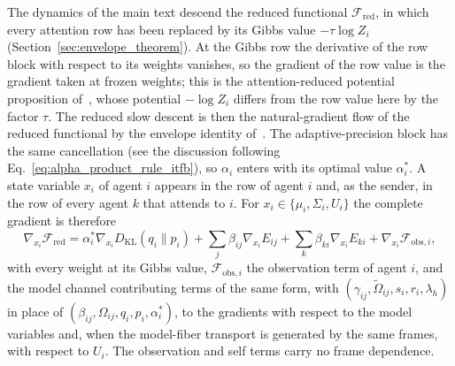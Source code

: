 The dynamics of the main text descend the reduced functional $\mathcal{F}_{\mathrm{red}}$, in which every attention row has been replaced by its Gibbs value $-\tau\log Z_i$ (Section~\ref{sec:envelope_theorem}). At the Gibbs row the derivative of the row block with respect to its weights vanishes, so the gradient of the row value is the gradient taken at frozen weights; this is the attention-reduced potential proposition of~\cite[Ch.~6]{DennisGaugeVFE2026}, whose potential $-\log Z_i$ differs from the row value here by the factor $\tau$. The reduced slow descent is then the natural-gradient flow of the reduced functional by the envelope identity of~\cite[Ch.~8]{DennisGaugeVFE2026}. The adaptive-precision block has the same cancellation (see the discussion following Eq.~\eqref{eq:alpha_product_rule_itfb}), so $\alpha_i$ enters with its optimal value $\alpha_i^*$. A state variable $x_i$ of agent $i$ appears in the row of agent $i$ and, as the sender, in the row of every agent $k$ that attends to $i$. For $x_i \in \{\mu_i, \Sigma_i, U_i\}$ the complete gradient is therefore
\begin{equation}
\nabla_{x_i}\mathcal{F}_{\mathrm{red}} = \alpha_i^*\nabla_{x_i}D_{\mathrm{KL}}(q_i \| p_i) + \sum_j \beta_{ij}\nabla_{x_i}E_{ij} + \sum_k \beta_{ki}\nabla_{x_i}E_{ki} + \nabla_{x_i}\mathcal{F}_{\mathrm{obs},i},
\label{eq:canonical_gradient_general}
\end{equation}
with every weight at its Gibbs value, $\mathcal{F}_{\mathrm{obs},i}$ the observation term of agent $i$, and the model channel contributing terms of the same form, with $(\gamma_{ij}, \tilde\Omega_{ij}, s_i, r_i, \lambda_h)$ in place of $(\beta_{ij}, \Omega_{ij}, q_i, p_i, \alpha_i^*)$, to the gradients with respect to the model variables and, when the model-fiber transport is generated by the same frames, with respect to $U_i$. The observation and self terms carry no frame dependence.

